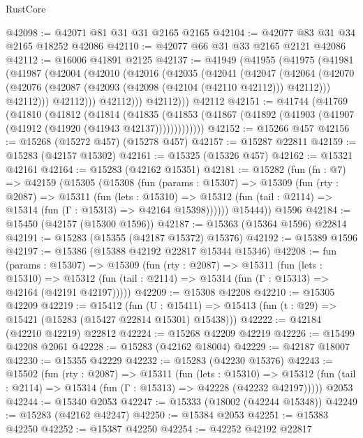 \begin{lexlean}{RustCore}
\begin{coremodule}
@42098 := @42071 @81 @31 @31 @2165 @2165
@42104 := @42077 @83 @31 @34 @2165 @18252 @42086
@42110 := @42077 @66 @31 @33 @2165 @2121 @42086
@42112 := @16006 @41891 @2125
@42137 := @41949
    (@41955
      (@41975
        (@41981
          (@41987
            (@42004
              (@42010
                (@42016
                  (@42035
                    (@42041
                      (@42047
                        (@42064
                          (@42070
                            (@42076 (@42087 (@42093 (@42098 (@42104 (@42110 @42112))) @42112)))
                            @42112)))
                      @42112)))
                @42112)))
          @42112)))
    @42112
@42151 := @41744
    (@41769
      (@41810
        (@41812
          (@41814
            (@41835
              (@41853 (@41867 (@41892 (@41903 (@41907 (@41912 (@41920 (@41943 @42137)))))))))))))
@42152 := @15266 @457
@42156 := @15268 (@15272 @457) (@15278 @457)
@42157 := @15287 @22811
@42159 := @15283 (@42157 @15302)
@42161 := @15325 (@15326 @457)
@42162 := @15321 @42161
@42164 := @15283 (@42162 @15351)
@42181 := @15282
    (fun (fn : @7) =>
    @42159
      (@15305
        (@15308
          (fun (params : @15307) =>
          @15309
            (fun (rty : @2087) =>
            @15311
              (fun (lets : @15310) =>
              @15312 (fun (tail : @2114) => @15314 (fun (Γ : @15313) => @42164 @15398))))))
        @15444))
    @1596
@42184 := @15450 (@42157 (@15300 @1596))
@42187 := @15363 (@15364 @1596) @22814
@42191 := @15283 (@15355 (@42187 @15372) @15376)
@42192 := @15389 @1596
@42197 := @15386 (@15388 @42192 @22817 @15344 @15346)
@42208 := fun (params : @15307) =>
  @15309
    (fun (rty : @2087) =>
    @15311
      (fun (lets : @15310) =>
      @15312 (fun (tail : @2114) => @15314 (fun (Γ : @15313) => @42164 (@42191 @42197)))))
@42209 := @15308 @42208
@42210 := @15305 @42209
@42219 := @15412
    (fun (U : @15411) => @15413 (fun (t : @29) => @15421 (@15283 (@15427 @22814 @15301) @15438)))
@42222 := @42184 (@42210 @42219) @22812
@42224 := @15268 @42209 @42219
@42226 := @15499 @42208 @2061
@42228 := @15283 (@42162 @18004)
@42229 := @42187 @18007
@42230 := @15355 @42229
@42232 := @15283 (@42230 @15376)
@42243 := @15502
    (fun (rty : @2087) =>
    @15311
      (fun (lets : @15310) =>
      @15312 (fun (tail : @2114) => @15314 (fun (Γ : @15313) => @42228 (@42232 @42197)))))
    @2053
@42244 := @15340 @2053
@42247 := @15333 (@18002 (@42244 @15348))
@42249 := @15283 (@42162 @42247)
@42250 := @15384 @2053
@42251 := @15383 @42250
@42252 := @15387 @42250
@42254 := @42252 @42192 @22817

\end{coremodule}
\end{lexlean}
